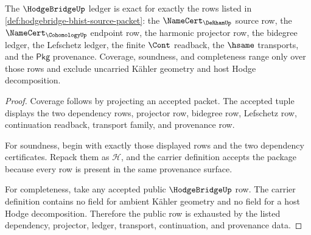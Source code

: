\begin{theorem}
\label{thm:hodgebridge-ledger-exactness}
The $\HodgeBridgeUp$ ledger is exact for exactly the rows listed in \autoref{def:hodgebridge-bhist-source-packet}: the $\NameCert_{\DeRhamUp}$ source row, the $\NameCert_{\CohomologyUp}$ endpoint row, the harmonic projector row, the bidegree ledger, the Lefschetz ledger, the finite $\Cont$ readback, the $\hsame$ transports, and the $\mathsf{Pkg}$ provenance. Coverage, soundness, and completeness range only over those rows and exclude uncarried K\"{a}hler geometry and host Hodge decomposition.
\end{theorem}
\begin{proof}
Coverage follows by projecting an accepted packet. The accepted tuple displays the two dependency rows, projector row, bidegree row, Lefschetz row, continuation readback, transport family, and provenance row.

For soundness, begin with exactly those displayed rows and the two dependency certificates. Repack them as $\mathcal{H}$, and the carrier definition accepts the package because every row is present in the same provenance surface.

For completeness, take any accepted public $\HodgeBridgeUp$ row. The carrier definition contains no field for ambient K\"{a}hler geometry and no field for a host Hodge decomposition. Therefore the public row is exhausted by the listed dependency, projector, ledger, transport, continuation, and provenance data.
\end{proof}

